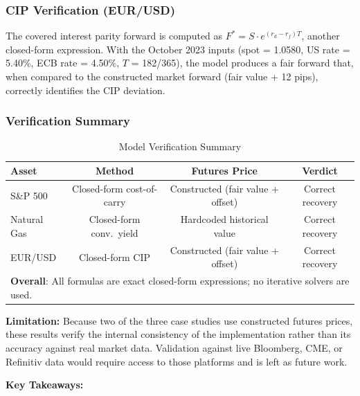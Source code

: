 \documentclass[12pt,a4paper]{article}
\begin{document}
\subsubsection{CIP Verification (EUR/USD)}

The covered interest parity forward is computed as $F^* = S \cdot e^{(r_d - r_f)T}$, another closed-form expression. With the October 2023 inputs (spot = 1.0580, US rate = 5.40\%, ECB rate = 4.50\%, $T$ = 182/365), the model produces a fair forward that, when compared to the constructed market forward (fair value + 12 pips), correctly identifies the CIP deviation.

\subsubsection{Verification Summary}

\begin{table}[H]
\centering
\caption{Model Verification Summary}
\label{tab:validation_summary}
\begin{tabular}{@{}lccc@{}}
\toprule
\textbf{Asset} & \textbf{Method} & \textbf{Futures Price} & \textbf{Verdict} \\
\midrule
S\&P 500 & Closed-form cost-of-carry & Constructed (fair value + offset) & Correct recovery \\
Natural Gas & Closed-form conv.\ yield & Hardcoded historical value & Correct recovery \\
EUR/USD & Closed-form CIP & Constructed (fair value + offset) & Correct recovery \\
\midrule
\multicolumn{4}{l}{\textbf{Overall}: All formulas are exact closed-form expressions; no iterative solvers are used.} \\
\bottomrule
\end{tabular}
\end{table}

\textbf{Limitation:} Because two of the three case studies use constructed futures prices, these results verify the internal consistency of the implementation rather than its accuracy against real market data. Validation against live Bloomberg, CME, or Refinitiv data would require access to those platforms and is left as future work.

\textbf{Key Takeaways:}
\end{document}

